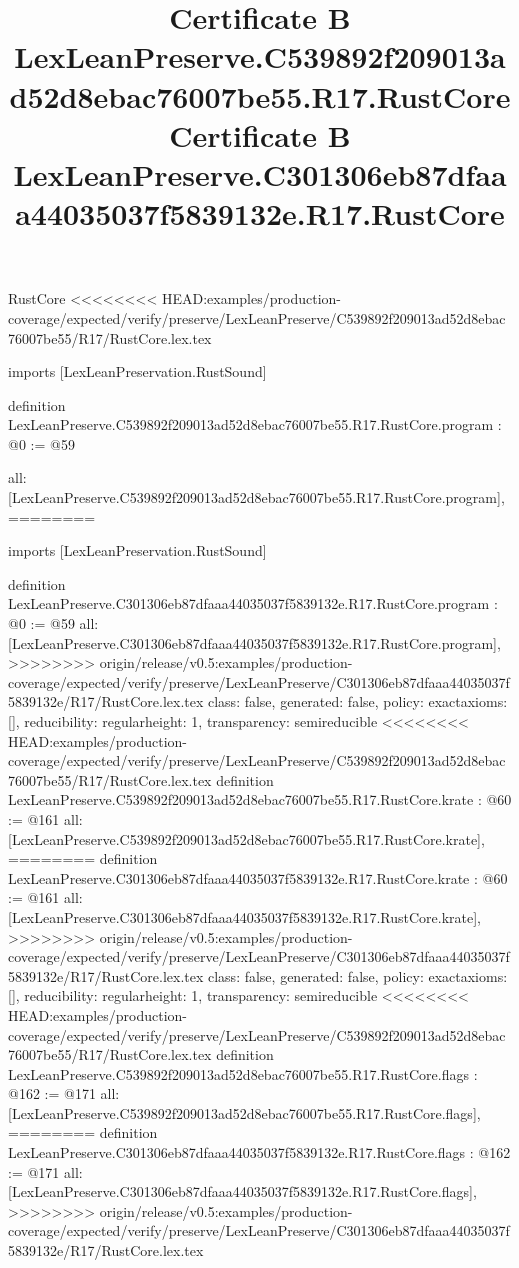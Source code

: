 \begin{lexlean}{RustCore}
<<<<<<<< HEAD:examples/production-coverage/expected/verify/preserve/LexLeanPreserve/C539892f209013ad52d8ebac76007be55/R17/RustCore.lex.tex
\title{Certificate B LexLeanPreserve.C539892f209013ad52d8ebac76007be55.R17.RustCore}
\begin{coremodule}
imports [LexLeanPreservation.RustSound]

definition LexLeanPreserve.C539892f209013ad52d8ebac76007be55.R17.RustCore.program : @0 := @59 {
  all: [LexLeanPreserve.C539892f209013ad52d8ebac76007be55.R17.RustCore.program],
========
\title{Certificate B LexLeanPreserve.C301306eb87dfaaa44035037f5839132e.R17.RustCore}
\begin{coremodule}
imports [LexLeanPreservation.RustSound]

definition LexLeanPreserve.C301306eb87dfaaa44035037f5839132e.R17.RustCore.program : @0 := @59 {
  all: [LexLeanPreserve.C301306eb87dfaaa44035037f5839132e.R17.RustCore.program],
>>>>>>>> origin/release/v0.5:examples/production-coverage/expected/verify/preserve/LexLeanPreserve/C301306eb87dfaaa44035037f5839132e/R17/RustCore.lex.tex
  class: false,
  generated: false,
  policy: exact{axioms: []},
  reducibility: regular{height: 1},
  transparency: semireducible
}
<<<<<<<< HEAD:examples/production-coverage/expected/verify/preserve/LexLeanPreserve/C539892f209013ad52d8ebac76007be55/R17/RustCore.lex.tex
definition LexLeanPreserve.C539892f209013ad52d8ebac76007be55.R17.RustCore.krate : @60 := @161 {
  all: [LexLeanPreserve.C539892f209013ad52d8ebac76007be55.R17.RustCore.krate],
========
definition LexLeanPreserve.C301306eb87dfaaa44035037f5839132e.R17.RustCore.krate : @60 := @161 {
  all: [LexLeanPreserve.C301306eb87dfaaa44035037f5839132e.R17.RustCore.krate],
>>>>>>>> origin/release/v0.5:examples/production-coverage/expected/verify/preserve/LexLeanPreserve/C301306eb87dfaaa44035037f5839132e/R17/RustCore.lex.tex
  class: false,
  generated: false,
  policy: exact{axioms: []},
  reducibility: regular{height: 1},
  transparency: semireducible
}
<<<<<<<< HEAD:examples/production-coverage/expected/verify/preserve/LexLeanPreserve/C539892f209013ad52d8ebac76007be55/R17/RustCore.lex.tex
definition LexLeanPreserve.C539892f209013ad52d8ebac76007be55.R17.RustCore.flags : @162 := @171 {
  all: [LexLeanPreserve.C539892f209013ad52d8ebac76007be55.R17.RustCore.flags],
========
definition LexLeanPreserve.C301306eb87dfaaa44035037f5839132e.R17.RustCore.flags : @162 := @171 {
  all: [LexLeanPreserve.C301306eb87dfaaa44035037f5839132e.R17.RustCore.flags],
>>>>>>>> origin/release/v0.5:examples/production-coverage/expected/verify/preserve/LexLeanPreserve/C301306eb87dfaaa44035037f5839132e/R17/RustCore.lex.tex
}}}
\end{coremodule}}
\end{coremodule}
\end{lexlean}
